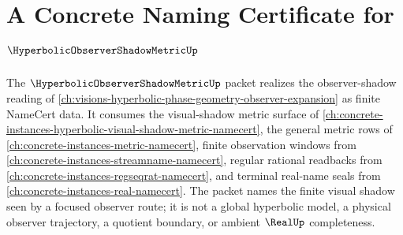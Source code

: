 \chapter{A Concrete Naming Certificate for $\HyperbolicObserverShadowMetricUp$}
\label{ch:concrete-instances-hyperbolic-observer-shadow-metric-namecert}

The $\HyperbolicObserverShadowMetricUp$ packet realizes the observer-shadow reading of \autoref{ch:visions-hyperbolic-phase-geometry-observer-expansion} as finite NameCert data. It consumes the visual-shadow metric surface of \autoref{ch:concrete-instances-hyperbolic-visual-shadow-metric-namecert}, the general metric rows of \autoref{ch:concrete-instances-metric-namecert}, finite observation windows from \autoref{ch:concrete-instances-streamname-namecert}, regular rational readbacks from \autoref{ch:concrete-instances-regseqrat-namecert}, and terminal real-name seals from \autoref{ch:concrete-instances-real-namecert}. The packet names the finite visual shadow seen by a focused observer route; it is not a global hyperbolic model, a physical observer trajectory, a quotient boundary, or ambient $\RealUp$ completeness.

